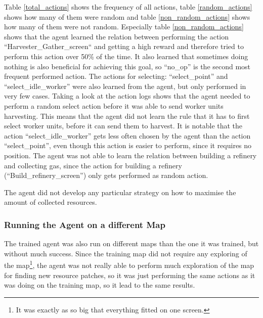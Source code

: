 \documentclass{article}
\begin{document}
Table \ref{total_actions} shows the frequency of all actions, table 
\ref{random_actions} shows how many of them were random and table 
\ref{non_random_actions} shows how many of them were not random. Especially 
table \ref{non_random_actions} shows that the agent learned the relation 
between performing the action ``Harvester\_Gather\_screen`` and getting a high 
reward and therefore tried to perform this action over 50\% of the time. It 
also learned that sometimes doing nothing is also beneficial for achieving this 
goal, so ``no\_op'' is the second most frequent performed action. The actions 
for selecting: ``select\_point'' and ``select\_idle\_worker'' were also learned 
from the agent, but only performed in very few cases. Taking a look at the 
action logs shows that the agent needed to perform a random select action 
before it was able to send worker units harvesting. This means that the agent 
did not learn the rule that it has to first select worker units, before it can 
send them to harvest. It is notable that the action ``select\_idle\_worker'' 
gets less often chosen by the agent than the action ``select\_point'', even 
though this action is easier to perform, since it requires no position. The 
agent was not able to learn the relation between building a refinery and 
collecting gas, since the action for building a refinery 
(``Build\_refinery\_screen'') only gets performed as random action.

The agent did not develop any particular strategy on how to maximise the amount 
of collected resources.

\subsubsection{Running the Agent on a different Map}
The trained agent was also run on different maps than the one it was trained, 
but without much success. Since the training map did not require any exploring 
of the map\footnote{It was exactly as so big that everything fitted on one 
screen.}, the agent was not really able to perform much exploration of the map 
for finding new resource patches, so it was just performing the same actions as 
it was doing on the training map, so it lead to the same results.
\end{document}
